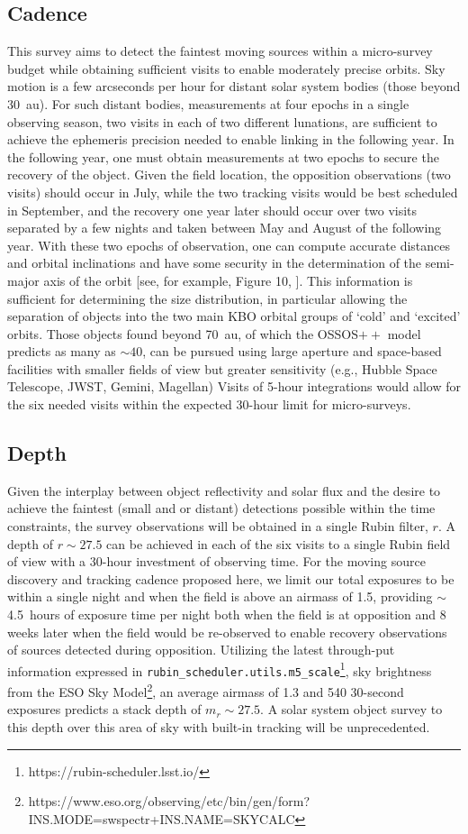 \documentclass[modern,linenumbers,trackchanges,preprint]{aastex631}
\begin{document}
\subsection{Cadence}
This survey aims to detect the faintest moving sources within a micro-survey budget while obtaining sufficient visits to enable moderately precise orbits.
Sky motion is a few arcseconds per hour for distant solar system bodies (those beyond 30~au). 
For such distant bodies, measurements at four epochs in a single observing season, two visits in each of two different lunations, are sufficient to achieve the ephemeris precision needed to enable linking in the following year.  
In the following year, one must obtain measurements at two epochs to secure the recovery of the object.  
Given the field location, the opposition observations (two visits) should occur in July, while the two tracking visits would be best scheduled in September, and the recovery one year later should occur over two visits separated by a few nights and taken between May and August of the following year. 
With these two epochs of observation, one can compute accurate distances and orbital inclinations and have some security in the determination of the semi-major axis of the orbit [see, for example, Figure 10, \citet{Bannister2016}].
This information is sufficient for determining the size distribution, in particular allowing the separation of objects into the two main KBO orbital groups of `cold' and `excited' orbits.
Those objects found beyond 70~au, of which the OSSOS$++$ model predicts as many as $\sim40$, can be pursued using large aperture and space-based facilities with smaller fields of view but greater sensitivity (e.g., Hubble Space Telescope, JWST, Gemini, Magellan) 
Visits of 5-hour integrations would allow for the six needed visits within the expected 30-hour limit for micro-surveys. 

\subsection{Depth}
Given the interplay between object reflectivity and solar flux and the desire to achieve the faintest (small and or distant) detections possible within the time constraints, the survey observations will be obtained in a single Rubin filter, $r$.
A depth of $r\sim 27.5$ can be achieved in each of the six visits to a single Rubin field of view with a 30-hour investment of observing time.
For the moving source discovery and tracking cadence proposed here, we limit our total exposures to be within a single night and when the field is above an airmass of 1.5, providing $\sim$4.5~hours of exposure time per night both when the field is at opposition and 8 weeks later when the field would be re-observed to enable recovery observations of sources detected during opposition.
Utilizing the latest through-put information expressed in \texttt{rubin\_scheduler.utils.m5\_scale}\footnote{https://rubin-scheduler.lsst.io/}, sky brightness from the ESO Sky Model\footnote{https://www.eso.org/observing/etc/bin/gen/form?INS.MODE=swspectr+INS.NAME=SKYCALC}, an average airmass of 1.3 and 540 30-second exposures predicts a stack depth of $m_r \sim 27.5$.
A solar system object survey to this depth over this area of sky with built-in tracking will be unprecedented.
\end{document}
